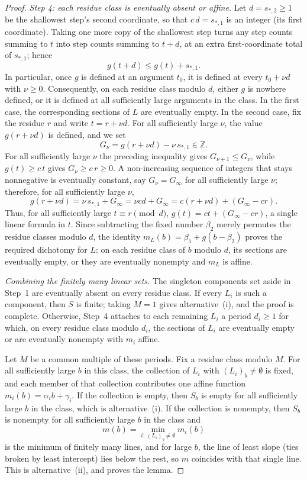 \documentclass[11pt]{article}
\theoremstyle{definition}
\newcommand{\Z}{\mathbb Z}
\begin{document}
\begin{proof}
\vspace{0.5em}
\noindent\emph{Step 4: each residue class is eventually absent or affine.}  Let
$d=s_{*,2}\ge 1$ be the shallowest step's second coordinate, so that
$c\,d=s_{*,1}$ is an integer (its first coordinate).  Taking one more copy of the
shallowest step turns any step counts summing to $t$ into step counts summing to
$t+d$, at an extra first-coordinate total of $s_{*,1}$; hence
\[
   g(t+d)\le g(t)+s_{*,1}.
\]
In particular, once $g$ is defined at an argument $t_0$, it is defined at every
$t_0+\nu d$ with $\nu\ge 0$.  Consequently, on each residue class modulo $d$,
either $g$ is nowhere defined, or it is defined at all sufficiently large
arguments in the class.  In the first case, the corresponding sections of $L$
are eventually empty.  In the second case, fix the residue $r$ and write
$t=r+\nu d$.  For all sufficiently large $\nu$, the value $g(r+\nu d)$ is
defined, and we set
\[
   G_\nu=g(r+\nu d)-\nu\,s_{*,1}\in\Z.
\]
For all sufficiently large $\nu$ the preceding inequality gives $G_{\nu+1}\le G_\nu$, while
$g(t)\ge c\,t$ gives $G_\nu\ge c\,r\ge 0$.  A non-increasing sequence of integers that stays
nonnegative is eventually constant, say $G_\nu=G_\infty$ for all sufficiently large $\nu$;
therefore, for all sufficiently large $\nu$,
\[
   g(r+\nu d)
   =\nu\,s_{*,1}+G_\infty
   =\nu c d+G_\infty
   =c(r+\nu d)+(G_\infty-c r).
\]
Thus, for all sufficiently large $t\equiv r\pmod d$,
$g(t)=c t+(G_\infty-c r)$, a single linear formula in $t$.
Since subtracting the fixed number $\beta_2$ merely permutes the residue classes
modulo $d$, the identity $m_L(b)=\beta_1+g(b-\beta_2)$ proves the required
dichotomy for $L$: on each residue class of $b$ modulo $d$, its sections are
eventually empty, or they are eventually nonempty and $m_L$ is affine.

\vspace{0.5em}
\noindent\emph{Combining the finitely many linear sets.}  The singleton
components set aside in Step~1 are eventually absent on every residue class.
If every $L_i$ is such a component, then $S$ is finite; taking $M=1$ gives
alternative~(i), and the proof is complete.  Otherwise, Step~4 attaches to each
remaining $L_i$ a period $d_i\ge1$ for which, on every residue class modulo
$d_i$, the sections of $L_i$ are eventually empty or are eventually nonempty
with $m_i$ affine.

Let $M$ be a common multiple of these periods.  Fix a residue class modulo
$M$.  For all sufficiently large $b$ in this class, the collection of $L_i$
with $(L_i)_b\neq\emptyset$ is fixed, and each member of that collection
contributes one affine function $m_i(b)=\alpha_i b+\gamma_i$.  If the collection
is empty, then $S_b$ is empty for all sufficiently large $b$ in the class,
which is alternative~(i).  If the collection is nonempty, then $S_b$ is
nonempty for all sufficiently large $b$ in the class and
\[
   m(b)=\min_{i:\,(L_i)_b\neq\emptyset} m_i(b)
\]
is the minimum of finitely many lines, and for large $b$, the line of least slope
(ties broken by least intercept) lies below the rest, so $m$ coincides with that
single line.  This is alternative~(ii), and proves the lemma.
\end{proof}
\end{document}
